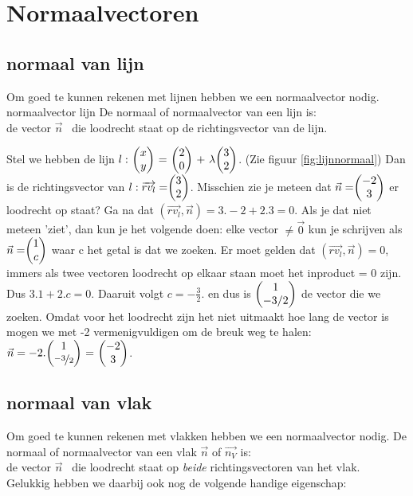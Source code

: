 \documentclass[hidelinks, a4wide, 12pt,  twoside]{book}
\begin{document}
\section{Normaalvectoren}
\subsection{normaal van lijn}

Om goed te kunnen rekenen met lijnen hebben we een normaalvector nodig.
\mydef
{normaalvector lijn}
{De normaal of normaalvector van een lijn is: \\
	de vector $ \vec{n} $  \ die loodrecht staat op de richtingsvector van de lijn.}

Stel we hebben de lijn $ l: \  \vectwee {x}{y} \ = \ \vectwee {2}{0} \ +\  \lambda  \vectwee {3}{2}  $. (Zie figuur  \ref{fig:lijnnormaal})
Dan is de richtingsvector van $ l:  \overrightarrow{rv_{l}} =  \vectwee {3}{2} $. Misschien zie je meteen dat $ \vec{n} =  \vectwee {-2}{3} $ er loodrecht op staat? Ga na dat  $ (\overrightarrow{rv_{l} }, \vec{n}) = 3.-2 + 2.3  = 0 $. Als je dat niet meteen 'ziet', dan kun je het volgende doen: elke vector  $ \ne \vec{0} $ kun je schrijven als  $ \vec{n} = \vectwee {1}{c} $ waar c het getal is dat we zoeken. Er moet gelden dat  $ (\overrightarrow{rv_{l} }, \vec{n}) = 0 $, immers als twee vectoren loodrecht op elkaar staan moet het inproduct = 0 zijn. Dus $ 3.1 + 2.c = 0 $. Daaruit volgt $ c =  -\frac{3}{2}. $ en dus is $ \vectwee {1}{-3/2} $ de vector die we zoeken. Omdat voor het loodrecht zijn het niet uitmaakt hoe lang de vector is mogen we met -2 vermenigvuldigen om de breuk weg te halen: $ \vec{n} = -2.\vectwee {1}{\nicefrac{-3}{2}} \ = \  \vectwee {-2}{3} $. 


\subsection{normaal van vlak}

Om goed te kunnen rekenen met vlakken hebben we een normaalvector nodig.
\label{vlaknormaal}
{De normaal of normaalvector van een vlak $\vec{n}$ of  $\overrightarrow{n_{V}}$ is:
	\\ de vector $ \vec{n} $  \ die loodrecht staat op \textit{beide} richtingsvectoren van het vlak. \\ 
	Gelukkig hebben we daarbij ook nog de volgende handige eigenschap:}
\end{document}
